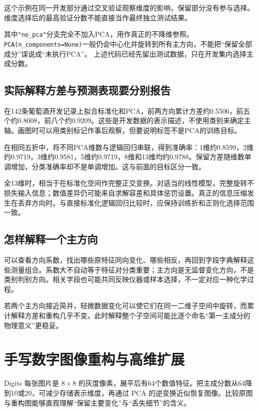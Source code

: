 这个示例在同一开发部分通过交叉验证观察维度的影响，保留部分没有参与选择。维度选择后的最高验证分数不能直接当作最终独立测试结果。

其中\texttt{"no\_pca"}分支完全不加入PCA，用作真正的不降维参照。\texttt{PCA(n\_components=None)}一般仍会中心化并旋转到所有主方向，不能把“保留全部成分”误说成“未执行PCA”。
上述代码已经先留出测试数据，只在开发集内选择主成分数。

\subsection{实际解释方差与预测表现要分别报告}
在142条葡萄酒开发记录上拟合标准化和PCA，前两方向累计方差约0.5506，前五个约0.8008，前八个约0.9209。这些是开发数据的表示描述，不使用类别来确定主轴。画图时可以用类别标记作事后观察，但要说明标签不是PCA的训练目标。


在相同五折中，将不同PCA维数与逻辑回归串联，得到准确率：1维约0.8599，2维约0.9719，3维约0.9581，5维约0.9719，8维和13维均约0.9788。保留方差随维数单调增加，分类准确率却不是单调增加。这与前面的目标区分一致。

全13维时，相当于在标准化空间作完整正交变换。对适当的线性模型，完整旋转不损失输入信息；数值差异仍可能来自求解容差和具体惩罚设置。真正的信息压缩发生在丢弃方向时。与直接标准化逻辑回归比较时，应保持训练折和正则化选择范围一致。

\subsection{怎样解释一个主方向}
可以查看方向系数，找出哪些原特征同向变化、哪些相反，再回到字段字典解释这些测量组合。系数大不自动等于特征对分类重要；主方向是无监督变化方向，不是类别判别方向。相关字段也可能共同反映仪器或样本选择，不一定对应一种化学过程。

若两个主方向接近简并，轻微数据变化可以使它们在同一二维子空间中旋转，而累计解释方差和重构几乎不变。此时解释整个子空间可能比逐个命名“第一主成分的物理意义”更稳妥。

\section{手写数字图像重构与高维扩展}
Digits 每张图片是 $8\times8$ 的灰度像素，展平后有64个数值特征。把主成分数从64降到10或20，可减少存储表示维度，再通过 PCA 的逆变换近似恢复图像。比较原图与重构图能够直观理解“保留主要变化”与“丢失细节”的含义。

